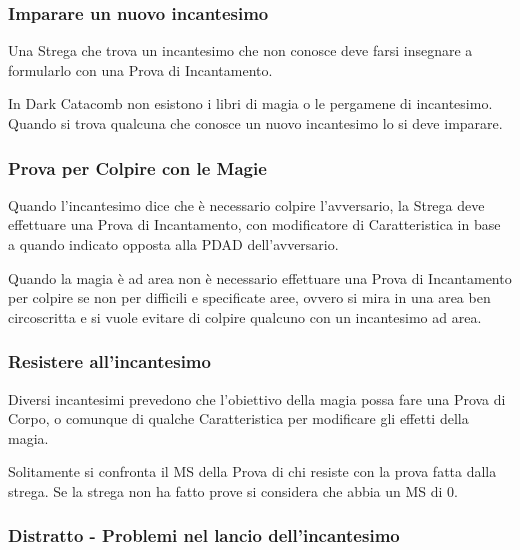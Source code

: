 \documentclass[12pt,a4paper,twoside,openany]{book}
\begin{document}
\begin{multicols}{2}
\subsubsection{Imparare un nuovo incantesimo}

Una Strega che trova un incantesimo che non conosce deve farsi insegnare a formularlo con una Prova di Incantamento.

\begin{narratore}
In Dark Catacomb non esistono i libri di magia o le pergamene di incantesimo. Quando si trova qualcuna che conosce un nuovo incantesimo lo si deve imparare.
\end{narratore}

\subsubsection{Prova per Colpire con le Magie}\label{magietiropercolpireconlemagie}

Quando l'incantesimo dice che è necessario colpire l'avversario, la Strega deve effettuare una Prova di Incantamento, con modificatore di Caratteristica in base a quando indicato opposta alla PDAD dell'avversario.

\medskip

Quando la magia è ad area non è necessario effettuare una Prova di Incantamento per colpire se non per difficili e specificate aree, ovvero si mira in una area ben circoscritta e si vuole evitare di colpire qualcuno con un incantesimo ad area.

\subsubsection{Resistere all'incantesimo}

Diversi incantesimi prevedono che l'obiettivo della magia possa fare una Prova di Corpo, o comunque di qualche Caratteristica per modificare gli effetti della magia.

Solitamente si confronta il MS della Prova di chi resiste con la prova fatta dalla strega. Se la strega non ha fatto prove si considera che abbia un MS di 0.

\subsubsection{Distratto - Problemi nel lancio dell'incantesimo}\label{magiedistratto}


\end{multicols}
\end{document}
